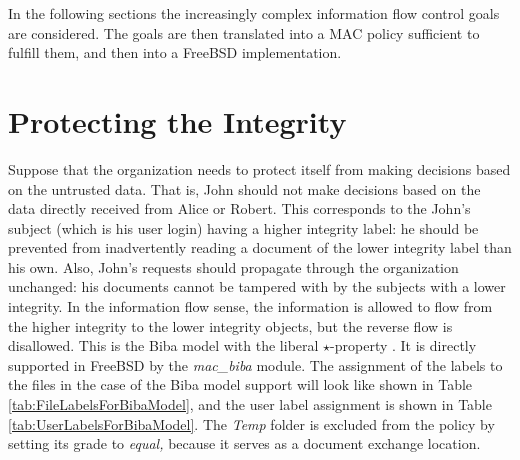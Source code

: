 \documentclass[10pt,a4paper,conference,onecolumn]{IEEEtran}
\newcommand{\KBERcode}[1]{\textsl{#1}}
\begin{document}
In the following sections the increasingly complex information flow 
control goals are considered. The goals are then translated into 
a MAC policy sufficient to fulfill them, and then into a
FreeBSD implementation. 


\section{Protecting the Integrity}

Suppose that the organization needs to protect itself from making
decisions based on the untrusted data. That is, John should not
make decisions based on the data directly received from Alice or
Robert.  This corresponds to the John's subject (which is his user login) 
having a higher integrity label: he
should be prevented from inadvertently reading a document of the
lower integrity label than his own. Also, John's requests should 
propagate through the organization unchanged: his documents
cannot be tampered with by the subjects with a lower integrity.
In the information flow sense, the information is allowed to flow
from the higher integrity to the lower integrity objects, but the
reverse flow is disallowed. This is the Biba model with the liberal
$\star$-property \cite{DBLP:journals/computer/Sandhu93}.
It is directly supported in FreeBSD by the \KBERcode{mac\_biba} module.
The assignment of the labels to the files in the case of the Biba
model support will look like shown in Table \ref{tab:FileLabelsForBibaModel},
and the user label assignment is shown in Table \ref{tab:UserLabelsForBibaModel}.
The \KBERcode{Temp} folder is excluded from the policy by setting its grade to
\KBERcode{equal,} because it serves
as a document exchange location.
\end{document}
